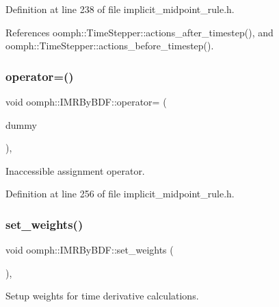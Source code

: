 Definition at line 238 of file implicit\+\_\+midpoint\+\_\+rule.\+h.



References oomph\+::\+Time\+Stepper\+::actions\+\_\+after\+\_\+timestep(), and oomph\+::\+Time\+Stepper\+::actions\+\_\+before\+\_\+timestep().

\mbox{\label{classoomph_1_1IMRByBDF_a0a1aec8458acb8cd8285f7b6d69fca4a}} 
\subsubsection{\texorpdfstring{operator=()}{operator=()}}
{\footnotesize\ttfamily void oomph\+::\+I\+M\+R\+By\+B\+D\+F\+::operator= (\begin{DoxyParamCaption}\item[{const \hyperlink{classoomph_1_1IMRByBDF}{I\+M\+R\+By\+B\+DF} \&}]{dummy }\end{DoxyParamCaption})\hspace{0.3cm}{\ttfamily [inline]}, {\ttfamily [private]}}



Inaccessible assignment operator. 



Definition at line 256 of file implicit\+\_\+midpoint\+\_\+rule.\+h.

\mbox{\label{classoomph_1_1IMRByBDF_a6060b6098113085753083a2dc53723ee}} 
\subsubsection{\texorpdfstring{set\+\_\+weights()}{set\_weights()}}
{\footnotesize\ttfamily void oomph\+::\+I\+M\+R\+By\+B\+D\+F\+::set\+\_\+weights (\begin{DoxyParamCaption}{ }\end{DoxyParamCaption})\hspace{0.3cm}{\ttfamily [inline]}, {\ttfamily [virtual]}}



Setup weights for time derivative calculations. 




